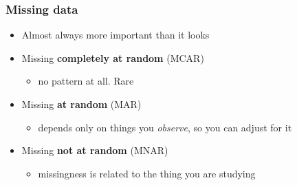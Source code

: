 \begin{frame}
\frametitle{Missing data}
\centering

\begin{itemize}
  \item Almost always more important than it looks
  \vspace{6pt}
  \item<2->[1.] Missing \textbf{completely at random} (MCAR)
  \begin{itemize}
    \item<2-> no pattern at all. Rare
  \end{itemize}
  \item<3->[2.] Missing \textbf{at random} (MAR)
  \begin{itemize}
    \item<3-> depends only on things you \textit{observe}, so you can adjust for it
  \end{itemize}
  \item<4->[3.] Missing \textbf{not at random} (MNAR)
  \begin{itemize}
    \item<4-> missingness is related to the thing you are studying
  \end{itemize}
\end{itemize}

\end{frame}

